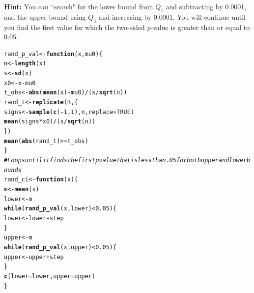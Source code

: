 \documentclass{article}\usepackage[]{graphicx}\usepackage[]{xcolor}
\makeatletter
\newcommand{\hlnum}[1]{\textcolor[rgb]{0.686,0.059,0.569}{#1}}%
\newcommand{\hlcom}[1]{\textcolor[rgb]{0.678,0.584,0.686}{\textit{#1}}}%
\newcommand{\hlopt}[1]{\textcolor[rgb]{0,0,0}{#1}}%
\newcommand{\hldef}[1]{\textcolor[rgb]{0.345,0.345,0.345}{#1}}%
\newcommand{\hlkwa}[1]{\textcolor[rgb]{0.161,0.373,0.58}{\textbf{#1}}}%
\newcommand{\hlkwb}[1]{\textcolor[rgb]{0.69,0.353,0.396}{#1}}%
\newcommand{\hlkwc}[1]{\textcolor[rgb]{0.333,0.667,0.333}{#1}}%
\newcommand{\hlkwd}[1]{\textcolor[rgb]{0.737,0.353,0.396}{\textbf{#1}}}%
\newenvironment{kframe}{%
 \def\at@end@of@kframe{}%
 \ifinner\ifhmode%
  \def\at@end@of@kframe{\end{minipage}}%
  \begin{minipage}{\columnwidth}%
 \fi\fi%
 \def\FrameCommand##1{\hskip\@totalleftmargin \hskip-\fboxsep
 \colorbox{shadecolor}{##1}\hskip-\fboxsep
     \hskip-\linewidth \hskip-\@totalleftmargin \hskip\columnwidth}%
 \MakeFramed {\advance\hsize-\width
   \@totalleftmargin\z@ \linewidth\hsize
   \@setminipage}}%
 {\par\unskip\endMakeFramed%
 \at@end@of@kframe}
\newenvironment{knitrout}{}{} %
\makeatother
\begin{document}
\begin{enumerate}
\begin{enumerate}
  \textbf{Hint:} You can ``search" for the lower bound from $Q_1$ and subtracting by 0.0001, 
  and the upper bound using $Q_3$ and increasing by 0.0001. You will continue until you find 
  the first value for which the two-sided $p$-value is greater than or equal to 0.05.
\begin{knitrout}\scriptsize
{}\color{fgcolor}\begin{kframe}
\begin{alltt}
\hldef{rand_p_val} \hlkwb{<-} \hlkwa{function}\hldef{(}\hlkwc{x}\hldef{,} \hlkwc{mu0}\hldef{) \{}
  \hldef{n}    \hlkwb{<-} \hlkwd{length}\hldef{(x)}
  \hldef{s}    \hlkwb{<-} \hlkwd{sd}\hldef{(x)}
  \hldef{x0}   \hlkwb{<-} \hldef{x} \hlopt{-} \hldef{mu0}
  \hldef{t_obs} \hlkwb{<-} \hlkwd{abs}\hldef{(}\hlkwd{mean}\hldef{(x)} \hlopt{-} \hldef{mu0)} \hlopt{/} \hldef{(s} \hlopt{/} \hlkwd{sqrt}\hldef{(n))}
  \hldef{rand_t} \hlkwb{<-} \hlkwd{replicate}\hldef{(R, \{}
    \hldef{signs} \hlkwb{<-} \hlkwd{sample}\hldef{(}\hlkwd{c}\hldef{(}\hlopt{-}\hlnum{1}\hldef{,}\hlnum{1}\hldef{), n,} \hlkwc{replace} \hldef{=} \hlnum{TRUE}\hldef{)}
    \hlkwd{mean}\hldef{(signs} \hlopt{*} \hldef{x0)} \hlopt{/} \hldef{(s} \hlopt{/} \hlkwd{sqrt}\hldef{(n))}
  \hldef{\})}
  \hlkwd{mean}\hldef{(}\hlkwd{abs}\hldef{(rand_t)} \hlopt{>=} \hldef{t_obs)}
\hldef{\}}
\hlcom{#Loops until it finds the first p value that is less than .05 for both upper and lower bounds}
\hldef{rand_ci} \hlkwb{<-} \hlkwa{function}\hldef{(}\hlkwc{x}\hldef{) \{}
  \hldef{m}   \hlkwb{<-} \hlkwd{mean}\hldef{(x)}
  \hldef{lower} \hlkwb{<-} \hldef{m}
  \hlkwa{while}\hldef{(}\hlkwd{rand_p_val}\hldef{(x, lower)} \hlopt{<} \hlnum{0.05}\hldef{) \{}
    \hldef{lower} \hlkwb{<-} \hldef{lower} \hlopt{-} \hldef{step}
  \hldef{\}}
  \hldef{upper} \hlkwb{<-} \hldef{m}
  \hlkwa{while}\hldef{(}\hlkwd{rand_p_val}\hldef{(x, upper)} \hlopt{<} \hlnum{0.05}\hldef{) \{}
    \hldef{upper} \hlkwb{<-} \hldef{upper} \hlopt{+} \hldef{step}
  \hldef{\}}
  \hlkwd{c}\hldef{(}\hlkwc{lower} \hldef{= lower,} \hlkwc{upper} \hldef{= upper)}
\hldef{\}}


\end{alltt}
\end{kframe}
\end{knitrout}
\end{enumerate}
\end{enumerate}
\end{document}
